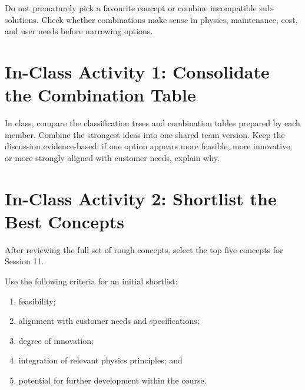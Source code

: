 
\begin{tcolorbox}[title=Common Mistakes]
Do not prematurely pick a favourite concept or combine incompatible sub-solutions. Check whether combinations make sense in physics, maintenance, cost, and user needs before narrowing options.
\end{tcolorbox}

\section{In-Class Activity 1: Consolidate the Combination Table}

In class, compare the classification trees and combination tables prepared by each member. Combine the strongest ideas into one shared team version. Keep the discussion evidence-based: if one option appears more feasible, more innovative, or more strongly aligned with customer needs, explain why.

\section{In-Class Activity 2: Shortlist the Best Concepts}

After reviewing the full set of rough concepts, select the top five concepts for Session 11.

Use the following criteria for an initial shortlist:
\begin{enumerate}
    \item feasibility;
    \item alignment with customer needs and specifications;
    \item degree of innovation;
    \item integration of relevant physics principles; and
    \item potential for further development within the course.
\end{enumerate}

